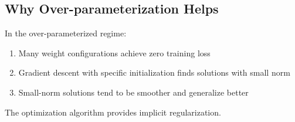 \subsection{Why Over-parameterization Helps}

\begin{keyinsight}
In the over-parameterized regime:
\begin{enumerate}
    \item Many weight configurations achieve zero training loss
    \item Gradient descent with specific initialization finds solutions with small norm
    \item Small-norm solutions tend to be smoother and generalize better
\end{enumerate}
The optimization algorithm provides implicit regularization.
\end{keyinsight}

